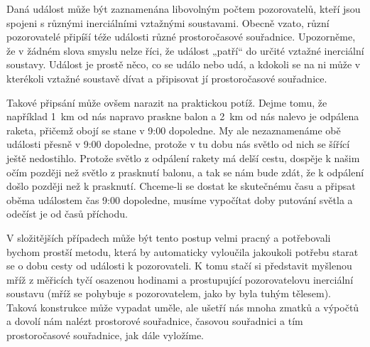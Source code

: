     Daná událost může být zaznamenána libovolným počtem pozorovatelů, kteří jsou spojeni s různými
    inerciálními vztažnými soustavami. Obecně vzato, různí pozorovatelé připíší téže události
    různé prostoročasové souřadnice. Upozorněme, že v žádném slova smyslu nelze říci, že událost
    „patří“ do určité vztažné inerciální soustavy. Událost je prostě něco, co se událo nebo udá, a
    kdokoli se na ni může v kterékoli vztažné soustavě dívat a připisovat jí prostoročasové
    souřadnice.

    Takové připsání může ovšem narazit na praktickou potíž. Dejme tomu, že například \SI{1}{\km} od
    nás napravo praskne balon a \SI{2}{\km} od nás nalevo je odpálena raketa, přičemž obojí se stane
    v 9:00 dopoledne. My ale nezaznamenáme obě události přesně v 9:00 dopoledne, protože v tu dobu
    nás světlo od nich se šířící ještě nedostihlo. Protože světlo z odpálení rakety má delší cestu,
    dospěje k našim očím později než světlo z prasknutí balonu, a tak se nám bude zdát, že k
    odpálení došlo později než k prasknutí. Chceme-li se dostat ke skutečnému času a připsat oběma
    událostem čas 9:00 dopoledne, musíme vypočítat doby putování světla a odečíst je od časů
    příchodu.

    V složitějších případech může být tento postup velmi pracný a potřebovali bychom prostší metodu,
    která by automaticky vyloučila jakoukoli potřebu starat se o dobu cesty od události k
    pozorovateli. K tomu stačí si představit myšlenou mříž z měřicích tyčí osazenou hodinami a
    prostupující pozorovatelovu inerciální soustavu (mříž se pohybuje s pozorovatelem, jako by
    byla tuhým tělesem). Taková konstrukce může vypadat uměle, ale ušetří nás mnoha zmatků a
    výpočtů a dovolí nám nalézt prostorové souřadnice, časovou souřadnici a tím prostoročasové
    souřadnice, jak dále vyložíme.


